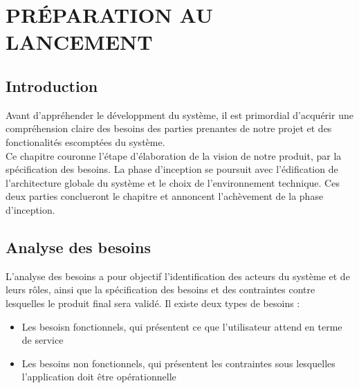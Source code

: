 \setcounter{chapter}{2}
\chapter{PRÉPARATION AU LANCEMENT}
\minitoc %
\graphicspath{{Chapitre3/figures/}}


\pagestyle{fancy}
\fancyhf{}
\fancyhead[R]{\bfseries\rightmark}
\fancyfoot[R]{\thepage}
\renewcommand{\headrulewidth}{0.5pt}
\renewcommand{\footrulewidth}{0pt}
\renewcommand{\chaptermark}[1]{\markboth{\MakeUppercase{\chaptername~\thechapter. #1 }}{}}
\renewcommand{\sectionmark}[1]{\markright{\thechapter.\thesection~ #1}}

\begin{spacing}{1.5}

\section*{Introduction}
Avant d'appréhender le développment du système, il est primordial d'acquérir une compréhension claire des besoins des parties prenantes de notre projet et des fonctionalités escomptées du système.\\
Ce chapitre couronne l'étape d'élaboration de la vision de notre produit, par la spécification des besoins. La phase d'inception se poursuit avec l'édification de l'architecture globale du système et le choix de l'environnement technique. Ces deux parties conclueront le chapitre et annoncent l'achèvement de la phase d'inception.

\section{Analyse des besoins}
L'analyse des besoins a pour objectif l'identification des acteurs du système et de leurs rôles, ainsi que la spécification des besoins et des contraintes contre lesquelles le produit final sera validé. Il existe deux types de besoins :
\begin{itemize}
    \item Les besoisn fonctionnels, qui présentent ce que l'utilisateur attend en terme de service
    \item Les besoins non fonctionnels, qui présentent les contraintes sous lesquelles l'application doit être opérationnelle
\end{itemize}


\end{spacing}
